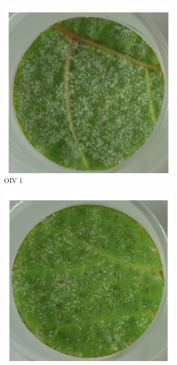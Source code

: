 \documentclass[english]{article}
\begin{document}
\begin{figure}[H]
    \centering
    \begin{subfigure}[b]{0.3\linewidth}
        \includegraphics[width=\linewidth]{oiv1.png}
        \caption{OIV 1}\label{fig:oiv1}
    \end{subfigure}
    \begin{subfigure}[b]{0.3\linewidth}
        \includegraphics[width=\linewidth]{oiv3.png}

\end{subfigure}
\end{figure}
\end{document}
